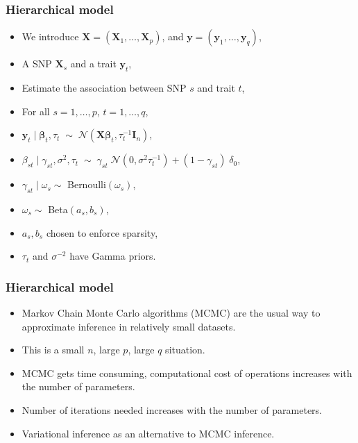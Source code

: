 \documentclass{beamer}
\begin{document}
\begin{frame}
\frametitle{Hierarchical model}
\begin{itemize}
\item We introduce $\boldsymbol{X} = (\boldsymbol{X}_1,\ldots,\boldsymbol{X}_p)$, and $\boldsymbol{y} = (\boldsymbol{y}_1,\ldots,\boldsymbol{y}_q)$,
\item A SNP $\boldsymbol{X}_s$ and a trait $\boldsymbol{y}_t$,
\item Estimate the association between SNP $s$ and trait $t$,
\item For all $s = 1,\ldots,p$, $t=1,\ldots,q$,
\item $\boldsymbol{y}_t \mid \boldsymbol{\beta}_t, \tau_t\; \sim\; \mathcal{N}(\boldsymbol{X\beta}_t,\tau_t^{-1}\boldsymbol{I}_n)$,
\item $\beta_{st}\mid\gamma_{st},\sigma^2,\tau_t\; \sim\; \gamma_{st}\;\mathcal{N}(0,\sigma^2\tau_t^{-1})+(1-\gamma_{st})\;\delta_0$,
\item $\gamma_{st} \mid \omega_{s} \sim $ Bernoulli$(\omega_s)$,
\item $\omega_s \sim $ Beta$(a_s,b_s)$,
\item $a_s, b_s$ chosen to enforce sparsity,
\item $\tau_t$ and $\sigma^{-2}$ have Gamma priors.

\end{itemize}

\end{frame}

\begin{frame}
\frametitle{Hierarchical model}
\begin{itemize}
\item Markov Chain Monte Carlo algorithms (MCMC) are the usual way to approximate inference in relatively small datasets.
\item This is a small $n$, large $p$, large $q$ situation.
\item MCMC gets time consuming, computational cost of operations increases with the number of parameters.
\item Number of iterations needed increases with the number of parameters.
\item Variational inference as an alternative to MCMC inference. 
\end{itemize}
\end{frame}
\end{document}
